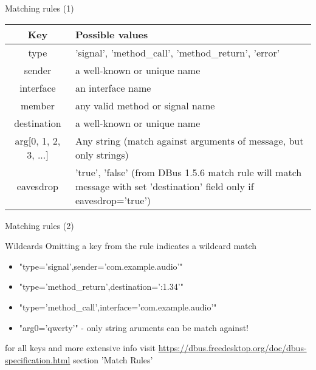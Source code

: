 \documentclass{beamer}
\begin{document}
\begin{frame}{Matching rules (1)}
  \begin{small}
    \begin{center}
      \begin{tabulary}{1.0\textwidth}{|C|L|}
\hline
Key & Possible values\\
\hline
\hline
type & 'signal', 'method\_call', 'method\_return', 'error'\\
\hline
sender & a well-known or unique name\\
\hline
interface & an interface name\\
\hline
member & 	any valid method or signal name\\
\hline
destination & a well-known or unique name\\
\hline
arg[0, 1, 2, 3, ...] & Any string (match against arguments of message, but only strings)\\
\hline
eavesdrop & 'true', 'false' (from DBus 1.5.6 match rule will match message with set 'destination' field only if eavesdrop='true')\\
\hline
      \end{tabulary}
    \end{center}
  \end{small} 
\end{frame}

\begin{frame}{Matching rules (2)}
  \begin{block}{Wildcards}
    Omitting a key from the rule indicates a wildcard match
  \end{block}
  \vfill
  \pause
  \begin{itemize}
    \item "type='signal',sender='com.example.audio'"
    \item "type='method\_return',destination=':1.34'"
    \item "type='method\_call',interface='com.example.audio'"
    \item "arg0='qwerty'" - only string aruments can be match against!
  \end{itemize}
  \vfill
  \begin{small}
    \begin{exampleblock}{for all keys and more extensive info visit}  
       \url{https://dbus.freedesktop.org/doc/dbus-specification.html} section 'Match Rules'\\
    \end{exampleblock}
  \end{small}
\end{frame}
\end{document}
